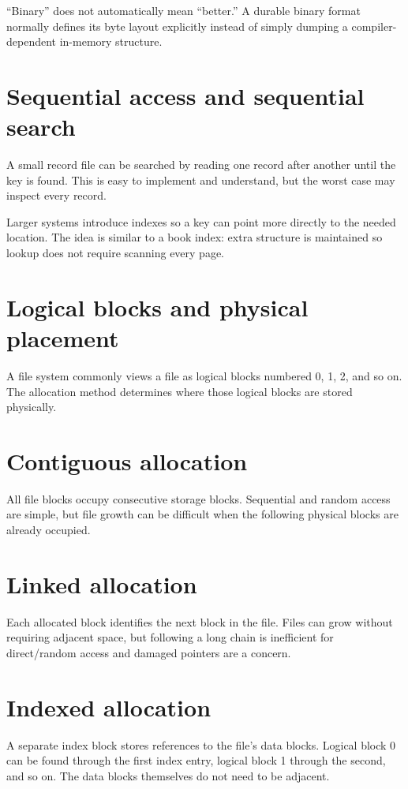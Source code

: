 \begin{pitfall}
``Binary'' does not automatically mean ``better.'' A durable binary format normally defines its byte layout explicitly instead of simply dumping a compiler-dependent in-memory structure.
\end{pitfall}

\section{Sequential access and sequential search}
A small record file can be searched by reading one record after another until the key is found. This is easy to implement and understand, but the worst case may inspect every record.

Larger systems introduce indexes so a key can point more directly to the needed location. The idea is similar to a book index: extra structure is maintained so lookup does not require scanning every page.

\section{Logical blocks and physical placement}
A file system commonly views a file as logical blocks numbered 0, 1, 2, and so on. The allocation method determines where those logical blocks are stored physically.

\section{Contiguous allocation}
All file blocks occupy consecutive storage blocks. Sequential and random access are simple, but file growth can be difficult when the following physical blocks are already occupied.

\section{Linked allocation}
Each allocated block identifies the next block in the file. Files can grow without requiring adjacent space, but following a long chain is inefficient for direct/random access and damaged pointers are a concern.

\section{Indexed allocation}
A separate index block stores references to the file's data blocks. Logical block 0 can be found through the first index entry, logical block 1 through the second, and so on. The data blocks themselves do not need to be adjacent.

